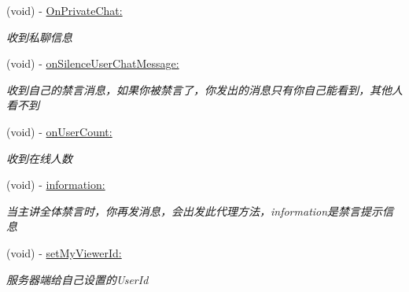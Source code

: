 \begin{DoxyCompactItemize}
(void) -\/ \hyperlink{protocol_request_data_delegate_01-p_a5408d30b923a72a0f667fc7b074d4792}{On\+Private\+Chat\+:}
\begin{DoxyCompactList}\small\item\em 收到私聊信息 \end{DoxyCompactList}\item 
\mbox{\label{protocol_request_data_delegate_01-p_a3f2560687b42d6a4eb2e3e531c42c3cc}} 
(void) -\/ \hyperlink{protocol_request_data_delegate_01-p_a3f2560687b42d6a4eb2e3e531c42c3cc}{on\+Silence\+User\+Chat\+Message\+:}
\begin{DoxyCompactList}\small\item\em 收到自己的禁言消息，如果你被禁言了，你发出的消息只有你自己能看到，其他人看不到 \end{DoxyCompactList}\item 
\mbox{\label{protocol_request_data_delegate_01-p_ac6835dc0e86081b1d6800da29653f39a}} 
(void) -\/ \hyperlink{protocol_request_data_delegate_01-p_ac6835dc0e86081b1d6800da29653f39a}{on\+User\+Count\+:}
\begin{DoxyCompactList}\small\item\em 收到在线人数 \end{DoxyCompactList}\item 
\mbox{\label{protocol_request_data_delegate_01-p_affce5046a6aad966caa3a1d46fd3eaf3}} 
(void) -\/ \hyperlink{protocol_request_data_delegate_01-p_affce5046a6aad966caa3a1d46fd3eaf3}{information\+:}
\begin{DoxyCompactList}\small\item\em 当主讲全体禁言时，你再发消息，会出发此代理方法，information是禁言提示信息 \end{DoxyCompactList}\item 
\mbox{\label{protocol_request_data_delegate_01-p_a65e153a53b88a4fceb9ef31f88034397}} 
(void) -\/ \hyperlink{protocol_request_data_delegate_01-p_a65e153a53b88a4fceb9ef31f88034397}{set\+My\+Viewer\+Id\+:}
\begin{DoxyCompactList}\small\item\em 服务器端给自己设置的\+User\+Id \end{DoxyCompactList}\item 

\end{DoxyCompactItemize}
